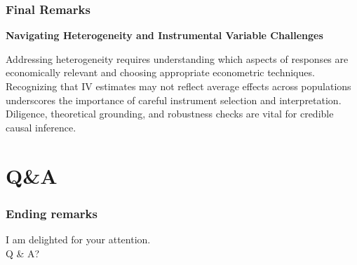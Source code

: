 \documentclass{beamer} %
\theoremstyle{definition}
\begin{document}
\begin{frame}[fragile]
	 \frametitle{Final Remarks} 
	 \textbf{Navigating Heterogeneity and Instrumental Variable Challenges} \
	
	Addressing heterogeneity requires understanding which aspects of responses are economically relevant and choosing appropriate econometric techniques.\\
	\vspace{1em}
	Recognizing that IV estimates may not reflect average effects across populations underscores the importance of careful instrument selection and interpretation. Diligence, theoretical grounding, and robustness checks are vital for credible causal inference. 
\end{frame}

\section{Q\&A}
\begin{frame}[fragile]
	\frametitle{Ending remarks}
	\begin{center}
		I am delighted for your attention.\\
		\vspace{1em}
		Q \& A?
	\end{center}
\end{frame}
\end{document}

